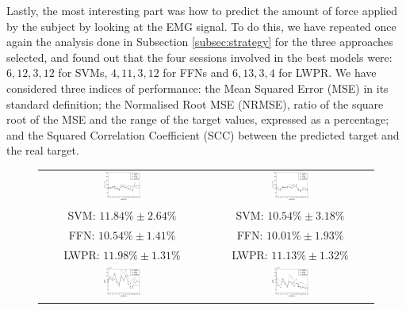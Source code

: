 Lastly, the most interesting part was how to predict the amount of
force applied by the subject by looking at the EMG signal. To do this,
we have repeated once again the analysis done in Subsection
\ref{subsec:strategy} for the three approaches selected, and found out
that the four sessions involved in the best models were: $6,12,3,12$
for SVMs, $4,11,3,12$ for FFNs and $6,13,3,4$ for LWPR. We have
considered three indices of performance: the Mean Squared Error (MSE)
in its standard definition; the Normalised Root MSE (NRMSE), ratio of
the square root of the MSE and the range of the target values,
expressed as a percentage; and the Squared Correlation Coefficient
(SCC) between the predicted target and the real target.

\begin{figure}[!ht] \centering
  \begin{tabular}{cc}
    \includegraphics[width=0.23\textwidth]{figs/fig_err_regr_resCrossBestOnDay1.eps} &
    \includegraphics[width=0.23\textwidth]{figs/fig_err_regr_resCrossBestOnDay2.eps} \\
     SVM: $11.84\% \pm 2.64\%$ &  SVM: $10.54\% \pm 3.18\%$ \\
     FFN: $10.54\% \pm 1.41\%$ &  FFN: $10.01\% \pm 1.93\%$ \\
    LWPR: $11.98\% \pm 1.31\%$ & LWPR: $11.13\% \pm 1.32\%$ \\
    \includegraphics[width=0.23\textwidth]{figs/fig_MSE_regr_resCrossBestOnDay1.eps} &
    \includegraphics[width=0.23\textwidth]{figs/fig_MSE_regr_resCrossBestOnDay2.eps} \\

\end{tabular}
\end{figure}
